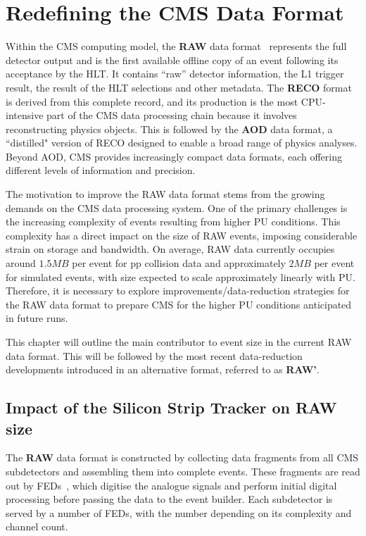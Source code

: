 \chapter{Redefining the CMS Data Format}
\thispagestyle{plain}  %
\pagestyle{chapterpages}
\label{Section:Chapter5}
\minitoc

Within the \ac{CMS} computing model, the \textbf{RAW} data format~\cite{LHC_CMS} represents the full detector output and is the first available offline copy of an event following its acceptance by the \ac{HLT}. It contains ``raw'' detector information, the \ac{L1} trigger result, the result of the \ac{HLT} selections and other metadata.  The \textbf{RECO} format is derived from this complete record, and its production is the most CPU-intensive part of the \ac{CMS} data processing chain because it involves reconstructing physics objects. This is followed by the \textbf{AOD} data format, a ``distilled" version of RECO designed to enable a broad range of physics analyses. Beyond AOD, \ac{CMS} provides increasingly compact data formats, each offering different levels of information and precision.

The motivation to improve the RAW data format stems from the growing demands on the \ac{CMS} data processing system. One of the primary challenges is the increasing complexity of events resulting from higher \ac{PU} conditions. This complexity has a direct impact on the size of RAW events, imposing considerable strain on storage and bandwidth.  On average, RAW data currently occupies around $1.5\unit{MB}$ per event for pp collision data and approximately $2\unit{MB}$ per event for simulated events, with size expected to scale approximately linearly with \ac{PU}. Therefore, it is necessary to explore improvements/data-reduction strategies for the RAW data format to prepare \ac{CMS} for the higher \ac{PU} conditions anticipated in future runs. 

This chapter will outline the main contributor to event size in the current RAW data format. This will be followed by the most recent data-reduction developments introduced in an alternative format, referred to as \textbf{RAW'}.

\section{Impact of the Silicon Strip Tracker on RAW size}
The \textbf{RAW} data format is constructed by collecting data fragments from all \ac{CMS} subdetectors and assembling them into complete events. These fragments are read out by \acp{FED}~\cite{LHC_CMS}, which digitise the analogue signals and perform initial digital processing before passing the data to the event builder. Each subdetector is served by a number of \acp{FED}, with the number depending on its complexity and channel count.

